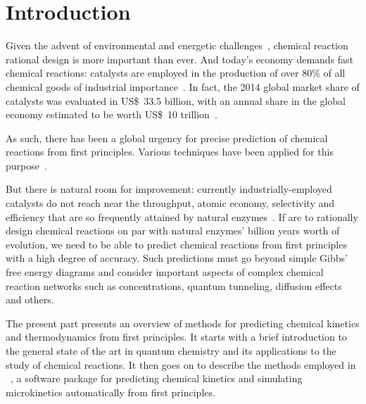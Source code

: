 \chapter{Introduction}%
\label{ch:introduction}

Given the advent of environmental and energetic challenges~\cite{Bertozzi_2016},
chemical reaction rational design is more important than ever.
And today's economy demands fast chemical reactions:
catalysts are employed in the production of over 80\% of all chemical
goods of industrial
importance~\cite{Breakthrough_Catalyst,GlobalCatalystMarket}.
In fact, the 2014 global market share of catalysts was evaluated in US\$~33.5 billion,
with an annual share in the global economy estimated to be worth US\$~10
trillion~\cite{GlobalCatalystMarket}.

As such, there has been a global urgency for precise prediction of chemical reactions from first principles.
Various techniques have been applied for this purpose~\cite{Cao2022}.

But there is natural room for improvement:
currently industrially-employed catalysts do
not reach near the throughput, atomic economy, selectivity and efficiency that
are so frequently attained by natural
enzymes~\cite{Catalysis_in_Chemistry_and_Enzymology}.
If are to rationally design chemical reactions on par with natural enzymes' billion years worth of evolution,
we need to be able to predict chemical reactions from first principles with a
high degree of accuracy.
Such predictions must go beyond simple Gibbs' free energy
diagrams and consider important aspects of complex chemical reaction networks
such as concentrations, quantum tunneling, diffusion effects and others.

The present part presents an overview of methods for predicting chemical
kinetics and thermodynamics from first principles.
It starts with a brief introduction to the general state of the art in quantum
chemistry and its applications to the study of chemical reactions.
It then goes on to describe the methods employed in
\overreact~\cite{Schneider2022}, a software
package for predicting chemical kinetics and simulating microkinetics
automatically from first principles.
